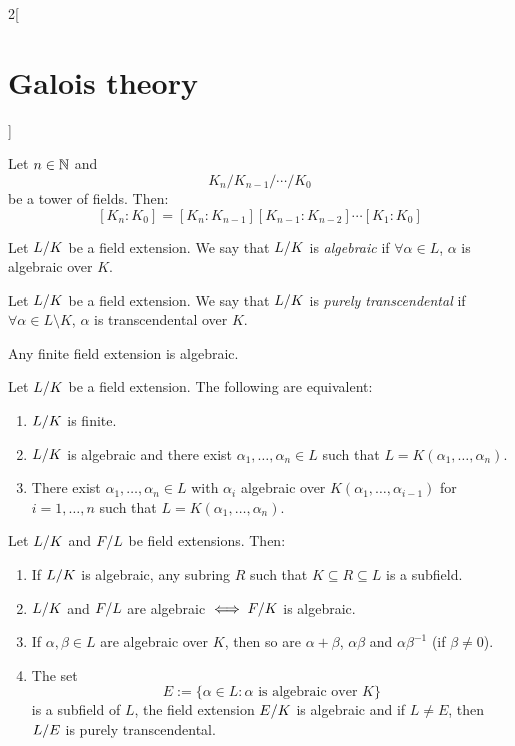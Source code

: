 \documentclass[../../../main.tex]{subfiles}
\begin{document}
\begin{multicols}{2}[\section{Galois theory}]
\begin{definition}
  \end{definition}
  \begin{corollary}
    Let $n\in\mathbb{N}$ and $$K_n/K_{n-1}/\cdots/K_0$$ be a tower of fields. Then: $$[K_n:K_0]=[K_n:K_{n-1}][K_{n-1}:K_{n-2}]\cdots[K_1:K_0]$$
  \end{corollary}
  \begin{definition}
    Let $\quot{L}{K}$ be a field extension. We say that $\quot{L}{K}$ is \textit{algebraic} if $\forall\alpha\in L$, $\alpha$ is algebraic over $K$.
  \end{definition}
  \begin{definition}
    Let $\quot{L}{K}$ be a field extension. We say that $\quot{L}{K}$ is \textit{purely transcendental} if $\forall\alpha\in L\setminus K$, $\alpha$ is transcendental over $K$.
  \end{definition}
  \begin{lemma}
    Any finite field extension is algebraic.
  \end{lemma}
  \begin{prop}
    Let $\quot{L}{K}$ be a field extension. The following are equivalent:
    \begin{enumerate}
      \item $\quot{L}{K}$ is finite.
      \item $\quot{L}{K}$ is algebraic and there exist $\alpha_1,\ldots,\alpha_n\in L$ such that $L=K(\alpha_1,\ldots,\alpha_n)$.
      \item There exist $\alpha_1,\ldots,\alpha_n\in L$ with $\alpha_i$ algebraic over $K(\alpha_1,\ldots,\alpha_{i-1})$ for $i=1,\ldots,n$ such that $L=K(\alpha_1,\ldots,\alpha_n)$.
    \end{enumerate}
  \end{prop}
  \begin{prop}
    Let $\quot{L}{K}$ and $\quot{F}{L}$ be field extensions. Then:
    \begin{enumerate}
      \item If $\quot{L}{K}$ is algebraic, any subring $R$ such that $K\subseteq R\subseteq L$ is a subfield.
      \item $\quot{L}{K}$ and $\quot{F}{L}$ are algebraic $\iff\quot{F}{K}$ is algebraic.
      \item If $\alpha,\beta\in L$ are algebraic over $K$, then so are $\alpha+\beta$, $\alpha\beta$ and $\alpha\beta^{-1}$ (if $\beta\ne 0$).
      \item The set $$E:=\{\alpha\in L:\alpha\text{ is algebraic over }K\}$$ is a subfield of $L$, the field extension $\quot{E}{K}$ is algebraic and if $L\ne E$, then $\quot{L}{E}$ is purely transcendental.
    \end{enumerate}
  \end{prop}

\end{multicols}
\end{document}
